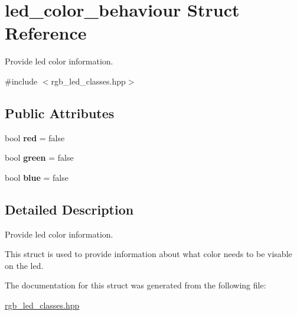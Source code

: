 \hypertarget{structled__color__behaviour}{}\section{led\+\_\+color\+\_\+behaviour Struct Reference}
\label{structled__color__behaviour}


Provide led color information.  




{\ttfamily \#include $<$rgb\+\_\+led\+\_\+classes.\+hpp$>$}

\subsection*{Public Attributes}
\begin{DoxyCompactItemize}
\item 
\hypertarget{structled__color__behaviour_a7b361774f3548f07e087525c2a78fe78}{}\label{structled__color__behaviour_a7b361774f3548f07e087525c2a78fe78} 
bool {\bfseries red} = false
\item 
\hypertarget{structled__color__behaviour_a35e719a7d391ab42db18595348acbdd5}{}\label{structled__color__behaviour_a35e719a7d391ab42db18595348acbdd5} 
bool {\bfseries green} = false
\item 
\hypertarget{structled__color__behaviour_acae43a677eaddda748c5bfd3a5caa75b}{}\label{structled__color__behaviour_acae43a677eaddda748c5bfd3a5caa75b} 
bool {\bfseries blue} = false
\end{DoxyCompactItemize}


\subsection{Detailed Description}
Provide led color information. 

This struct is used to provide information about what color needs to be visable on the led. 

The documentation for this struct was generated from the following file\+:\begin{DoxyCompactItemize}
\item 
\hyperlink{rgb__led__classes_8hpp}{rgb\+\_\+led\+\_\+classes.\+hpp}\end{DoxyCompactItemize}
